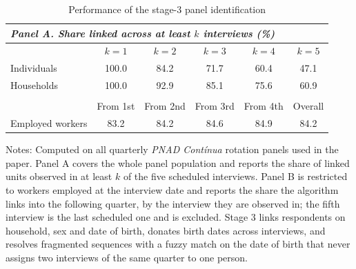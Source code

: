 \begin{table}[H]
\centering
\caption{Performance of the stage-3 panel identification}
\label{tab:matching}
\begin{threeparttable}
\begin{tabular}{lccccc}
\multicolumn{6}{l}{\textit{Panel A. Share linked across at least $k$ interviews (\%)}} \\
\toprule
& $k=1$ & $k=2$ & $k=3$ & $k=4$ & $k=5$ \\
\midrule
Individuals & 100.0 & 84.2 & 71.7 & 60.4 & 47.1 \\
Households & 100.0 & 92.9 & 85.1 & 75.6 & 60.9 \\
\bottomrule
\addlinespace
\multicolumn{6}{l}{\textit{Panel B. Share matched into the next quarter, by interview (\%)}} \\
\toprule
& From 1st & From 2nd & From 3rd & From 4th & Overall \\
\midrule
Employed workers & 83.2 & 84.2 & 84.6 & 84.9 & 84.2 \\
\bottomrule
\end{tabular}
\begin{tablenotes}[flushleft]\footnotesize
\item Notes: Computed on all quarterly \textit{PNAD Cont\'inua} rotation panels used in the paper. Panel A covers the whole panel population and reports the share of linked units observed in at least $k$ of the five scheduled interviews. Panel B is restricted to workers employed at the interview date and reports the share the algorithm links into the following quarter, by the interview they are observed in; the fifth interview is the last scheduled one and is excluded. Stage 3 links respondents on household, sex and date of birth, donates birth dates across interviews, and resolves fragmented sequences with a fuzzy match on the date of birth that never assigns two interviews of the same quarter to one person.
\end{tablenotes}
\end{threeparttable}
\end{table}
